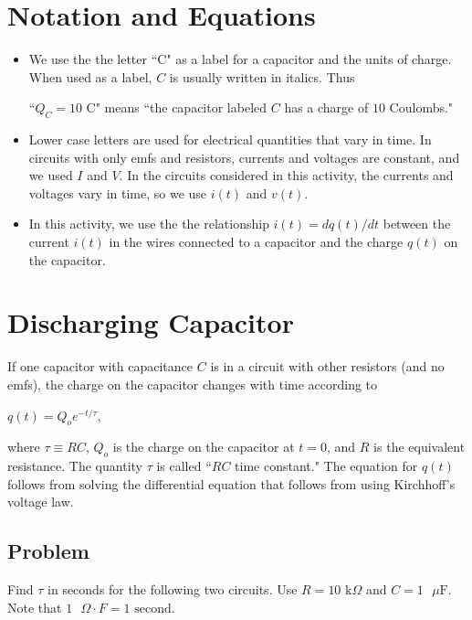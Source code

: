 \documentclass{article}
\begin{document}
\section{Notation and Equations}

\begin{itemize}

  \item We use the the letter ``C" as a label for a capacitor and the units of charge. When used as a label, $C$ is usually written in italics. Thus

        ``$Q_C= 10 \text{ C}$" means ``the capacitor labeled $C$ has a charge of $10$ Coulombs."

  \item Lower case letters are used for electrical quantities that vary in time. In circuits with only emfs and resistors, currents and voltages are constant, and we used $I$ and $V$. In the circuits considered in this activity, the currents and voltages vary in time, so we use $i(t)$ and $v(t)$.

  \item In this activity, we use the the relationship $i(t)=dq(t)/dt$ between the current $i(t)$ in the wires connected to a capacitor and the charge $q(t)$ on the capacitor.

\end{itemize}

\section{Discharging Capacitor}

If one capacitor with capacitance $C$ is in a circuit with other resistors (and no emfs), the charge on the capacitor changes with time according to

$q(t)=Q_oe^{-t/\tau}$,

where $\tau\equiv RC$, $Q_o$ is the charge on the capacitor at $t=0$, and $R$ is the equivalent resistance. The quantity $\tau$ is called ``$RC$ time constant." The equation for $q(t)$ follows from solving the differential equation that follows from using Kirchhoff's voltage law.

\subsection{Problem}

Find $\tau$ in seconds for the following two circuits. Use $R=10\text{ k}\Omega$ and $C=1\text{ }\mu\text{F}$. Note that $1 \text{ }\Omega\cdot F = 1 \text{ second}$.
\end{document}
